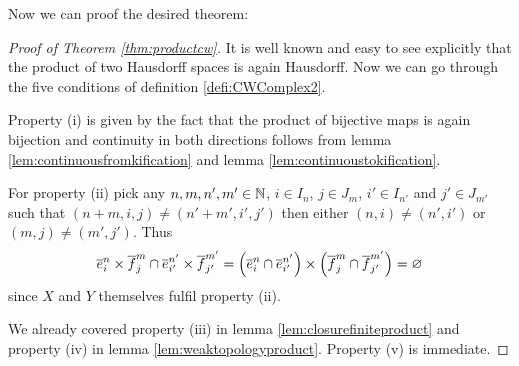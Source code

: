 Now we can proof the desired theorem:

\begin{proof}[Proof of Theorem \ref{thm:productcw}]
    It is well known and easy to see explicitly that the product of two Hausdorff spaces is again Hausdorff. 
    Now we can go through the five conditions of definition \ref{defi:CWComplex2}. 

    Property (i) is given by the fact that the product of bijective maps is again bijection and continuity in both directions follows from lemma \ref{lem:continuousfromkification} and lemma \ref{lem:continuoustokification}. 

    For property (ii) pick any $n, m, n', m' \in \bN$, $i \in I_n$, $j \in J_m$, $i' \in I_{n'}$ and $j' \in J_{m'}$ such that $(n + m, i, j) \ne (n' + m', i', j')$ then either $(n, i) \ne (n', i')$ or $(m, j) \ne (m', j')$. 
    Thus 
    \[\closedCell{n}{i} \times \closedCellf{m}{j} \cap \closedCell{n'}{i'} \times \closedCellf{m'}{j'} = \left (\closedCell{n}{i} \cap \closedCell{n'}{i'} \right ) \times \left ( \closedCellf{m}{j} \cap \closedCellf{m'}{j'} \right ) = \varnothing\]
    since $X$ and $Y$ themselves fulfil property (ii). 

    We already covered property (iii) in lemma \ref{lem:closurefiniteproduct} and property (iv) in lemma \ref{lem:weaktopologyproduct}. 
    Property (v) is immediate.
\end{proof}